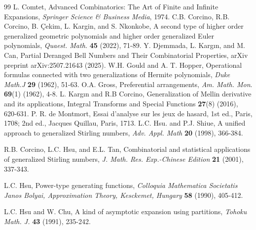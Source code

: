 \documentclass[12pt]{amsart}
\newtheorem{proof 1}{proof 1}
\begin{document}
\begin{thebibliography}{99}
 	L. Comtet, Advanced Combinatorics: The Art of Finite and Infinite Expansions, \textit{Springer Science \& Business Media}, 1974.
 	 C.B. Corcino, R.B. Corcino, B. \c{C}ekim, L. Kargin, and S. Nkonkobe, A second type of higher order generalized geometric polynomials and higher order generalized {E}uler polynomials, \textit{Quaest. Math.} {\bf45} (2022),  71-89.
 	Y. Djemmada, L. Kargın, and M. Can, Partial Deranged Bell Numbers and Their Combinatorial Properties, arXiv preprint arXiv:2507.21643 (2025).
 	W.H. Gould and A. T. Hopper, Operational formulas connected with two generalizations of Hermite polynomials, \textit{Duke Math.J} \textbf{29} (1962), 51-63.
 	O.A. Gross, Preferential arrangements, \textit{Am. Math. Mon}. {\bf69}(1) (1962), 4-8.
 	L. Kargın and R.B Corcino, Generalization of Mellin derivative and its applications, Integral Transforms and Special Functions \textbf{27}(8) (2016), 620-631.
 	P. R. de Montmort, Essai d’analyse sur les jeux de hasard, 1st ed., Paris, 1708; 2nd ed., Jacques Quillau, Paris, 1713. 
L.C. Hsu. and P.J. Shiue,
A unified approach to generalized {S}tirling numbers,
\textit{Adv. Appl. Math} {\bf20} (1998),
{366-384}.
 	
	R.B. Corcino, L.C. Hsu,  and E.L. Tan,
Combinatorial and statistical applications of generalized {S}tirling numbers, \textit{ J. Math. Res. Exp.-Chinese Edition} {\bf21} (2001), 337-343.
 

 L.C. Hsu, Power-type generating functions, \textit{Colloquia Mathematica Societatis Janos Bolyai, Approximation Theory, Kesckemet, Hungary}
{\bf58} (1990),  405-412.

 L.C. Hsu  and W. Chu,
{A kind of asymptotic expansion using partitions}, \textit{Tohoku Math. J.} {\bf43} (1991), {235-242}.



\end{thebibliography}
\end{document}
